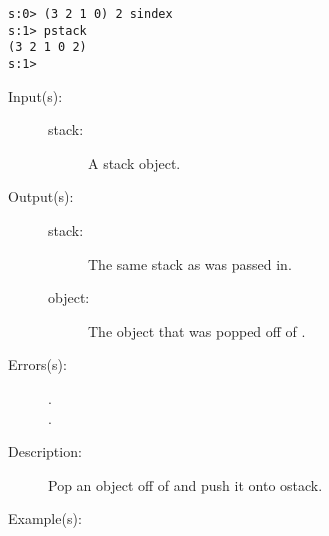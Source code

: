 \begin{description}
\begin{description}
\begin{verbatim}
s:0> (3 2 1 0) 2 sindex
s:1> pstack
(3 2 1 0 2)
s:1>
		\end{verbatim}
	\end{description}
\label{systemdict:spop}
\item[{\stilop{stack}{spop}{stack object}}: ]
	\begin{description}\item[]
	\item[Input(s): ]
		\begin{description}\item[]
		\item[stack: ]
			A stack object.
		\end{description}
	\item[Output(s): ]
		\begin{description}\item[]
		\item[stack: ]
			The same stack as was passed in.
		\item[object: ]
			The object that was popped off of .
		\end{description}
	\item[Errors(s): ]
		\begin{description}\item[]
		\item[.]
		\item[.]
		\end{description}
	\item[Description: ]
		Pop an object off of  and push it onto ostack.
	\item[Example(s): ]\begin{verbatim}


\end{verbatim}
\end{description}
\end{description}
